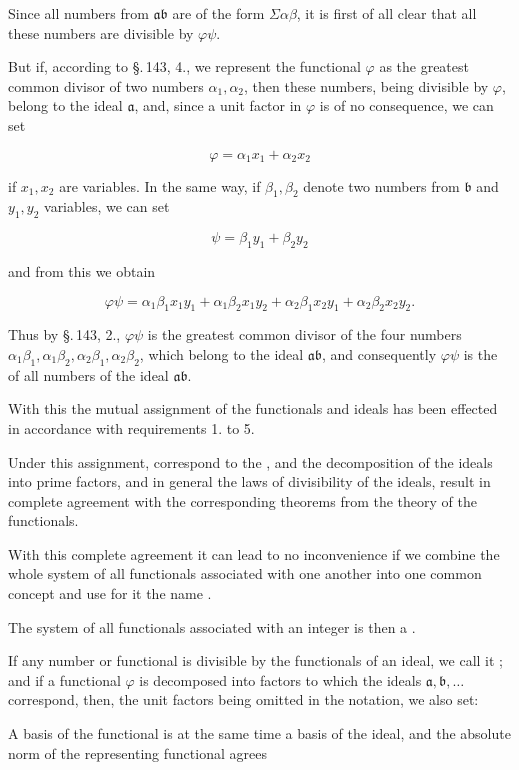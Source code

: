 Since all numbers from $\mathfrak{a}\mathfrak{b}$ are of the form $\Sigma\alpha\beta$, it is first of all
clear that all these numbers are divisible by $\varphi\psi$.

But if, according to \S.\,143, 4., we represent the functional $\varphi$ as the
greatest common divisor of two numbers $\alpha_1, \alpha_2$, then
these numbers, being divisible by $\varphi$, belong to the ideal $\mathfrak{a}$,
and, since a unit factor in $\varphi$ is of no
consequence, we can set

\[
\varphi = \alpha_1 x_1 + \alpha_2 x_2
\]

if $x_1, x_2$ are variables. In the same way, if
$\beta_1, \beta_2$ denote two numbers from $\mathfrak{b}$ and $y_1, y_2$ variables, we can set

\[
\psi = \beta_1 y_1 + \beta_2 y_2
\]

and from this we obtain

\[
\varphi\psi = \alpha_1 \beta_1 x_1 y_1 + \alpha_1 \beta_2 x_1 y_2 + \alpha_2 \beta_1 x_2 y_1 + \alpha_2 \beta_2 x_2 y_2.
\]

Thus by \S.\,143, 2., $\varphi\psi$ is the greatest common
divisor of the four numbers $\alpha_1\beta_1, \alpha_1\beta_2, \alpha_2\beta_1, \alpha_2\beta_2$, which belong to the ideal
$\mathfrak{a}\mathfrak{b}$, and consequently $\varphi\psi$ is the  of all numbers of the ideal $\mathfrak{a}\mathfrak{b}$.

With this the mutual assignment of the functionals and
ideals has been effected in accordance with requirements 1. to 5.

Under this assignment,  correspond to the
, and the decomposition of the ideals into prime factors, and
in general the laws of divisibility of the ideals, result
in complete agreement with the corresponding theorems
from the theory of the functionals.

With this complete agreement it can lead to no
inconvenience if we combine the whole system of all functionals
associated with one another into one common concept
 and use for it the name .

The system of all functionals associated with an integer
 is then a .

If any number or functional is divisible by the
functionals of an ideal, we call it ; and if a functional $\varphi$ is decomposed into factors
to which the ideals $\mathfrak{a}, \mathfrak{b}, \ldots$ correspond, then,
the unit factors being omitted in the notation,
 we also set:


A basis of the functional is at the same time a basis of the ideal,
and the absolute norm of the representing functional agrees
